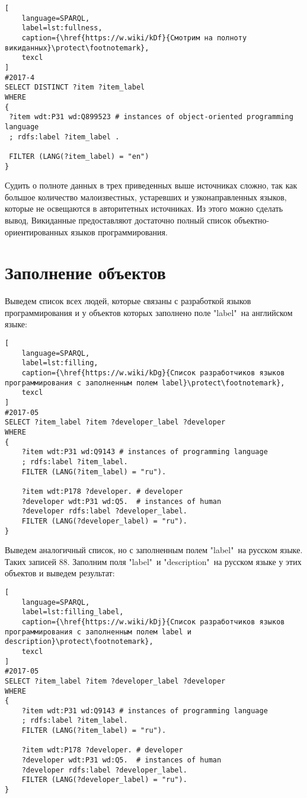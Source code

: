 \begin{lstlisting}[
	language=SPARQL,
	label=lst:fullness,
	caption={\href{https://w.wiki/kDf}{Смотрим на полноту викиданных}\protect\footnotemark},
	texcl
]
#2017-4
SELECT DISTINCT ?item ?item_label
WHERE
{
 ?item wdt:P31 wd:Q899523 # instances of object-oriented programming language
 ; rdfs:label ?item_label . 

 FILTER (LANG(?item_label) = "en")
}
\end{lstlisting}

Судить о полноте данных в трех приведенных выше источниках сложно, так как большое количество малоизвестных, устаревших и узконаправленных языков, которые не освещаются в авторитетных источниках. Из этого можно сделать вывод, Викиданные предоставляют достаточно полный список объектно-ориентированных языков программирования.

\section{Заполнение объектов}
Выведем список всех людей, которые связаны с разработкой языков программирования и у объектов которых заполнено поле "label"\  на английском языке:

\begin{lstlisting}[
	language=SPARQL,
	label=lst:filling,
	caption={\href{https://w.wiki/kDg}{Список разработчиков языков программирования с заполненным полем label}\protect\footnotemark},
	texcl
]
#2017-05
SELECT ?item_label ?item ?developer_label ?developer
WHERE
{
    ?item wdt:P31 wd:Q9143 # instances of programming language
    ; rdfs:label ?item_label. 
    FILTER (LANG(?item_label) = "ru"). 

    ?item wdt:P178 ?developer. # developer 
    ?developer wdt:P31 wd:Q5.  # instances of human
    ?developer rdfs:label ?developer_label. 
    FILTER (LANG(?developer_label) = "ru").  
}
\end{lstlisting}
Выведем аналогичный список, но с заполненным полем "label"\  на русском языке. Таких записей 88. Заполним поля "label"\  и "description"\  на русском языке у этих объектов и выведем результат:

\begin{lstlisting}[
	language=SPARQL,
	label=lst:filling_label,
	caption={\href{https://w.wiki/kDj}{Список разработчиков языков программирования с заполненным полем label и description}\protect\footnotemark},
	texcl
]
#2017-05
SELECT ?item_label ?item ?developer_label ?developer
WHERE
{
    ?item wdt:P31 wd:Q9143 # instances of programming language
    ; rdfs:label ?item_label. 
    FILTER (LANG(?item_label) = "ru"). 

    ?item wdt:P178 ?developer. # developer 
    ?developer wdt:P31 wd:Q5.  # instances of human
    ?developer rdfs:label ?developer_label. 
    FILTER (LANG(?developer_label) = "ru").  
}
\end{lstlisting}
